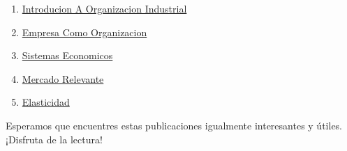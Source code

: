 \documentclass[
  jou,
  floatsintext,
  longtable,
  a4paper,
  nolmodern,
  notxfonts,
  notimes,
  12pt,
  colorlinks=true,linkcolor=blue,citecolor=blue,urlcolor=blue]{apa7}
\providecommand{\tightlist}{%
  \setlength{\itemsep}{0pt}\setlength{\parskip}{0pt}}
\begin{document}
\begin{enumerate}
\def\labelenumi{\arabic{enumi}.}
\tightlist
\item
  \href{https://optimums.netlify.app/organizacion-industrial/2023-06-12-introducion-a-organizacion-industrial/index.pdf}{}
  \href{https://optimums.netlify.app/organizacion-industrial/2023-06-12-introducion-a-organizacion-industrial}{Introducion
  A Organizacion Industrial}
\item
  \href{https://optimums.netlify.app/organizacion-industrial/2023-06-13-empresa-como-organizacion/index.pdf}{}
  \href{https://optimums.netlify.app/organizacion-industrial/2023-06-13-empresa-como-organizacion}{Empresa
  Como Organizacion}
\item
  \href{https://optimums.netlify.app/organizacion-industrial/2023-06-13-sistemas-economicos/index.pdf}{}
  \href{https://optimums.netlify.app/organizacion-industrial/2023-06-13-sistemas-economicos}{Sistemas
  Economicos}
\item
  \href{https://optimums.netlify.app/organizacion-industrial/2023-06-15-mercado-relevante/index.pdf}{}
  \href{https://optimums.netlify.app/organizacion-industrial/2023-06-15-mercado-relevante}{Mercado
  Relevante}
\item
  \href{https://optimums.netlify.app/organizacion-industrial/2023-06-23-elasticidad/index.pdf}{}
  \href{https://optimums.netlify.app/organizacion-industrial/2023-06-23-elasticidad}{Elasticidad}
\end{enumerate}

Esperamos que encuentres estas publicaciones igualmente interesantes y
útiles. ¡Disfruta de la lectura!
\end{document}
